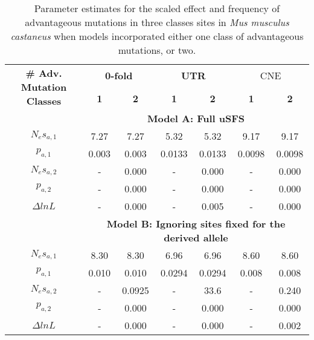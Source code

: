 \begin{table}[h!]
\centering
\caption[Parameter estimates for the scaled effect and frequency of advantageous mutations in three classes sites]{Parameter estimates for the scaled effect and frequency of advantageous mutations in three classes sites in \textit{Mus musculus castaneus} when models incorporated either one class of advantageous mutations, or two. }
 \begin{tabular}{c c c c c c c} 
\toprule
\multirow{2}{*}{\textbf{\# Adv. Mutation Classes}} &	\multicolumn{2}{c}{\textbf{0-fold}}	& \multicolumn{2}{c}{\textbf{UTR}}	& \multicolumn{2}{c}{CNE\textbf{}} \\ \cline{2-7}
	& \textbf{1} &	\textbf{2} &	\textbf{1} &	\textbf{2} &\textbf{	1} &\textbf{	2} \\ \hline 
 &	\multicolumn{6}{c}{\textbf{Model A: Full uSFS}} \\ \hline
$N_es_{a,1}$	 & 7.27	& 7.27	& 5.32	& 5.32	 & 9.17	 & 9.17 \\
$p_{a,1}$ &	0.003	& 0.003	& 0.0133 & 	0.0133 &	0.0098 &	0.0098 \\
$N_es_{a,2}$ & 	- &	0.000 &	- &	0.000 &	- &	0.000 \\
$p_{a,2}$ &	-	& 0.000	& -	& 0.000 &	- &	0.000 \\
$\Delta lnL$ &	-	 & 0.000 &	-	& 0.005	& - &	0.000 \\ \hline
 &	\multicolumn{6}{c}{\textbf{Model B: Ignoring sites fixed for the derived allele}} \\ \hline
$N_es_{a,1}$ &	8.30	 & 8.30	& 6.96	& 6.96	& 8.60	& 8.60 \\
$p_{a,1}$ &	0.010 &	0.010	& 0.0294 &	0.0294	& 0.008 &	0.008 \\
$N_es_{a,2}$ &	- &	0.0925 &	- &	33.6	 & - &	0.240 \\
$p_{a,2}$ &	- &	0.000 &	- &	0.000 &	- &	0.000 \\
$\Delta lnL$  &	- &	0.000 &	- &	0.000 	& - &	0.002 \\
\bottomrule
\end{tabular}
\label{tab:CS5}
\end{table}